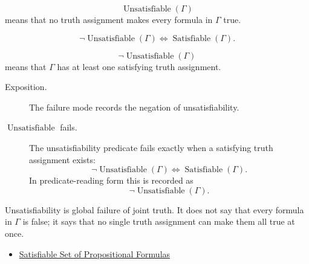 \begin{remark*}
\[
\operatorname{Unsatisfiable}(\Gamma)
\]
means that no truth assignment makes every formula in \(\Gamma\) true.
\end{remark*}

\begin{remark*}
\[
\neg\operatorname{Unsatisfiable}(\Gamma)
\Longleftrightarrow
\operatorname{Satisfiable}(\Gamma).
\]
\end{remark*}

\begin{remark*}
\[
\neg\operatorname{Unsatisfiable}(\Gamma)
\]
means that \(\Gamma\) has at least one satisfying truth assignment.
\end{remark*}

\begin{remark*}
\begin{description}
  \item[Exposition.] The failure mode records the negation of unsatisfiability.
  \item[\(\operatorname{Unsatisfiable}\) fails.] The unsatisfiability predicate
  fails exactly when a satisfying truth assignment exists:
  \[
  \neg\operatorname{Unsatisfiable}(\Gamma)
  \Longleftrightarrow
  \operatorname{Satisfiable}(\Gamma).
  \]
  In predicate-reading form this is recorded as
  \[
  \neg\operatorname{Unsatisfiable}(\Gamma).
  \]
\end{description}
\end{remark*}

\begin{remark*}[Interpretation]
Unsatisfiability is global failure of joint truth. It does not say that every
formula in \(\Gamma\) is false; it says that no single truth assignment can
make them all true at once.
\end{remark*}

\begin{dependencies}
\begin{itemize}
  \item \hyperref[def:satisfiable-set-of-propositional-formulas]{Satisfiable Set of Propositional Formulas}
\end{itemize}
\end{dependencies}
